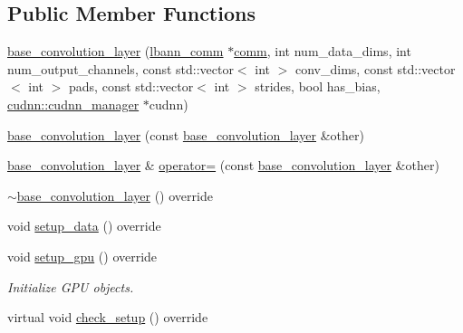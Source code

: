 \subsection*{Public Member Functions}
\begin{DoxyCompactItemize}
\item 
\hyperlink{classlbann_1_1base__convolution__layer_a1489c6034dc88a8749ccd0ae4a3b02a8}{base\+\_\+convolution\+\_\+layer} (\hyperlink{classlbann_1_1lbann__comm}{lbann\+\_\+comm} $\ast$\hyperlink{file__io_8cpp_ab048c6f9fcbcfaa57ce68b00263dbebe}{comm}, int num\+\_\+data\+\_\+dims, int num\+\_\+output\+\_\+channels, const std\+::vector$<$ int $>$ conv\+\_\+dims, const std\+::vector$<$ int $>$ pads, const std\+::vector$<$ int $>$ strides, bool has\+\_\+bias, \hyperlink{classlbann_1_1cudnn_1_1cudnn__manager}{cudnn\+::cudnn\+\_\+manager} $\ast$cudnn)
\item 
\hyperlink{classlbann_1_1base__convolution__layer_a5ffba3070c459e3fc1dc1a5ecdaf5e0c}{base\+\_\+convolution\+\_\+layer} (const \hyperlink{classlbann_1_1base__convolution__layer}{base\+\_\+convolution\+\_\+layer} \&other)
\item 
\hyperlink{classlbann_1_1base__convolution__layer}{base\+\_\+convolution\+\_\+layer} \& \hyperlink{classlbann_1_1base__convolution__layer_ad31a2eac6843bd8643538530f1017c32}{operator=} (const \hyperlink{classlbann_1_1base__convolution__layer}{base\+\_\+convolution\+\_\+layer} \&other)
\item 
\hyperlink{classlbann_1_1base__convolution__layer_a2622ff3205a5feba6e75f86ec2e3c0d8}{$\sim$base\+\_\+convolution\+\_\+layer} () override
\item 
void \hyperlink{classlbann_1_1base__convolution__layer_a9f850c1bdf4ae3cd986411d3cb3a524c}{setup\+\_\+data} () override
\item 
void \hyperlink{classlbann_1_1base__convolution__layer_a4fb0ec8793656a7c32ff37c266b29a68}{setup\+\_\+gpu} () override
\begin{DoxyCompactList}\small\item\em Initialize G\+PU objects. \end{DoxyCompactList}\item 
virtual void \hyperlink{classlbann_1_1base__convolution__layer_afa07aaa293d12cc7d28fbc8a96025900}{check\+\_\+setup} () override
\end{DoxyCompactItemize}
